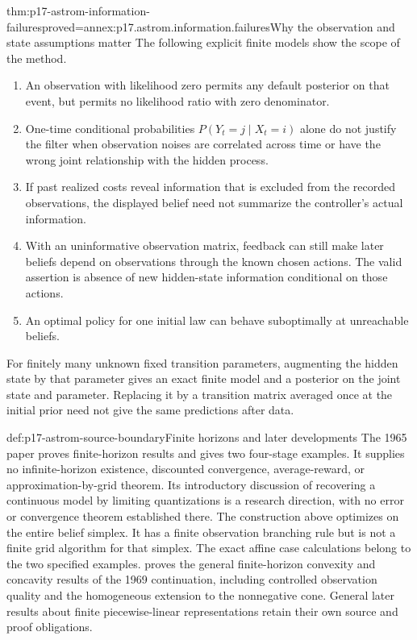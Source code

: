 \begin{hbtheorem}{thm:p17-astrom-information-failures}{proved=annex:p17.astrom.information.failures}{Why the observation and state assumptions matter}
The following explicit finite models show the scope of the method.
\begin{enumerate}
\item An observation with likelihood zero permits any default
      posterior on that event, but permits no likelihood ratio
      with zero denominator.
\item One-time conditional probabilities \(P(Y_t=j\mid X_t=i)\)
      alone do not justify the filter when observation noises
      are correlated across time or have the wrong joint
      relationship with the hidden process.
\item If past realized costs reveal information that is excluded
      from the recorded observations, the displayed belief need
      not summarize the controller's actual information.
\item With an uninformative observation matrix, feedback can still
      make later beliefs depend on observations through the known
      chosen actions. The valid assertion is absence of new
      hidden-state information conditional on those actions.
\item An optimal policy for one initial law can behave
      suboptimally at unreachable beliefs.
\end{enumerate}
For finitely many unknown fixed transition parameters, augmenting
the hidden state by that parameter gives an exact finite model
and a posterior on the joint state and parameter. Replacing it
by a transition matrix averaged once at the initial prior
need not give the same predictions after data.
\end{hbtheorem}

\begin{proofboundary}{def:p17-astrom-source-boundary}{Finite horizons and later developments}
The 1965 paper proves finite-horizon results and gives two
four-stage examples. It supplies no infinite-horizon existence,
discounted convergence, average-reward, or approximation-by-grid
theorem. Its introductory discussion of recovering a continuous
model by limiting quantizations is a research direction, with
no error or convergence theorem established there.
The construction above optimizes on the entire belief simplex.
It has a finite observation branching rule but is not a finite
grid algorithm for that simplex.
The exact affine case calculations belong to the two specified
examples.  proves
the general finite-horizon convexity and concavity results of
the 1969 continuation, including controlled observation quality
and the homogeneous extension to the nonnegative cone.
General later results about finite piecewise-linear representations
retain their own source and proof obligations.
\end{proofboundary}
